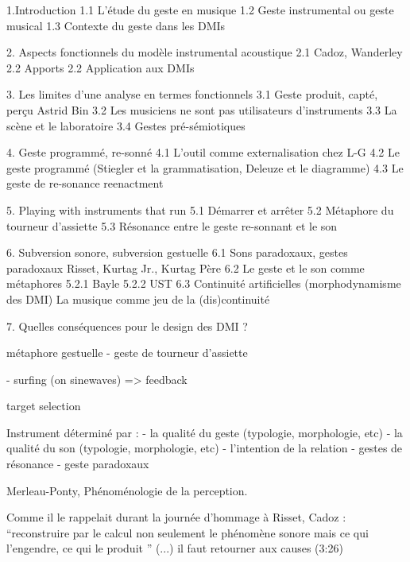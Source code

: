 1.Introduction
	1.1 L'étude du geste en musique
	1.2 Geste instrumental ou geste musical
	1.3 Contexte du geste dans les DMIs

2. Aspects fonctionnels du modèle instrumental acoustique
	2.1 Cadoz, Wanderley
	2.2 Apports
	2.2 Application aux DMIs

3. Les limites d'une analyse en termes fonctionnels
	3.1 Geste produit, capté, perçu
		Astrid Bin
	3.2 Les musiciens ne sont pas utilisateurs d'instruments
	3.3 La scène et le laboratoire
	3.4 Gestes pré-sémiotiques

4. Geste programmé, re-sonné
	4.1 L'outil comme externalisation chez L-G
	4.2 Le geste programmé (Stiegler et la grammatisation, Deleuze et le diagramme)
	4.3 Le geste de re-sonance
		reenactment

5. Playing with instruments that run
	5.1 Démarrer et arrêter
	5.2 Métaphore du tourneur d'assiette
	5.3 Résonance entre le geste re-sonnant et le son

6. Subversion sonore, subversion gestuelle
	6.1 Sons paradoxaux, gestes paradoxaux
		Risset, Kurtag Jr., Kurtag Père
	6.2 Le geste et le son comme métaphores
		5.2.1 Bayle
		5.2.2 UST
	6.3 Continuité artificielles (morphodynamisme des DMI)
		La musique comme jeu de la (dis)continuité


7. Quelles conséquences pour le design des DMI ?



métaphore gestuelle
- geste de tourneur d'assiette

- surfing (on sinewaves)
=> feedback

target selection



Instrument déterminé par :
- la qualité du geste (typologie, morphologie, etc)
- la qualité du son (typologie, morphologie, etc)
- l'intention de la relation
	- gestes de résonance
	- geste paradoxaux




 Merleau-Ponty, Phénoménologie de la perception.


Comme il le rappelait durant la journée d'hommage à Risset, Cadoz : ``reconstruire par le calcul non seulement le phénomène sonore mais ce qui l'engendre, ce qui le produit '' (...) il faut retourner aux causes (3:26)



